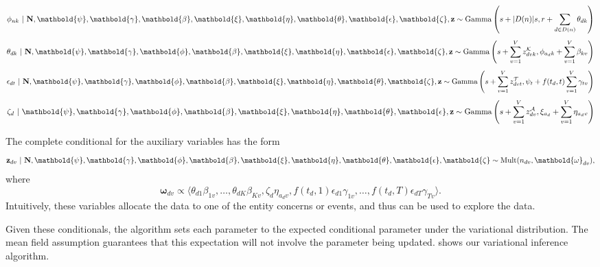 \begin{equation}
\phi_{nk} \g \mathbf{N}, \mathbold{\psi}, \mathbold{\gamma}, \mathbold{\beta}, \mathbold{\xi}, \mathbold{\eta}, \mathbold{\theta}, \mathbold{\epsilon}, \mathbold{\zeta}, \mathbf{z} \sim 
	\mbox{Gamma}\left(
		s + |D(n)| s,
		r + \sum_{d\in D(n)} \theta_{dk}
	\right)
\label{eq:phi}
\end{equation}
\begin{equation}
\theta_{dk} \g \mathbf{N}, \mathbold{\psi}, \mathbold{\gamma}, \mathbold{\phi}, \mathbold{\beta}, \mathbold{\xi}, \mathbold{\eta}, \mathbold{\epsilon}, \mathbold{\zeta}, \mathbf{z} \sim 
	\mbox{Gamma}\left(
		s + \sum_{v=1}^V z^\mathcal{K}_{dvk},
		\phi_{a_d k} + \sum_{v=1}^V \beta_{kv}
	\right)
\label{eq:theta}
\end{equation}
\begin{equation}
\epsilon_{dt} \g \mathbf{N}, \mathbold{\psi}, \mathbold{\gamma}, \mathbold{\phi}, \mathbold{\beta}, \mathbold{\xi}, \mathbold{\eta}, \mathbold{\theta}, \mathbold{\zeta}, \mathbf{z} \sim 
	\mbox{Gamma}\left(
		s + \sum_{v=1}^V z^\mathcal{T}_{dvt},
		\psi_t + f(t_d, t) \sum_{v=1}^V \gamma_{tv}
	\right)
\label{eq:epsilon}
\end{equation}
\begin{equation}
\zeta_{d} \g \mathbold{\psi}, \mathbold{\gamma}, \mathbold{\phi}, \mathbold{\beta}, \mathbold{\xi}, \mathbold{\eta}, \mathbold{\theta}, \mathbold{\epsilon}, \mathbf{z} \sim 
	\mbox{Gamma}\left(
		s + \sum_{v=1}^V z^\mathcal{A}_{dv},
		\xi_{a_d} + \sum_{v=1}^V \eta_{a_d v}
	\right)
\label{eq:zeta}
\end{equation}

The complete conditional for the auxiliary variables has the form
\[\mathbf{z}_{dv} \g \mathbf{N}, \mathbold{\psi}, \mathbold{\gamma}, \mathbold{\phi}, \mathbold{\beta}, \mathbold{\xi}, \mathbold{\eta}, \mathbold{\theta}, \mathbold{\epsilon}, \mathbold{\zeta} \sim \mbox{Mult}(n_{dv}, \mathbold{\omega}_{dv}),\] where
\begin{equation}
\mathbold{\omega}_{dv} \propto \langle 
\theta_{d1} \beta_{1v}, \dots, \theta_{dK} \beta_{Kv}, \zeta_d \eta_{a_d v}, 
f(t_d, 1) \epsilon_{d1} \gamma_{1v}, \dots, f(t_d, T) \epsilon_{dT} \gamma_{Tv}\rangle.
\label{eq:omega}
\end{equation}
Intuitively, these variables allocate the data to one of the entity concerns or events, and thus can be used to explore the data.

Given these conditionals, the algorithm sets each parameter to the expected conditional parameter under the variational distribution. The mean field assumption guarantees that this expectation will not involve the parameter being updated.   shows our variational inference algorithm.

